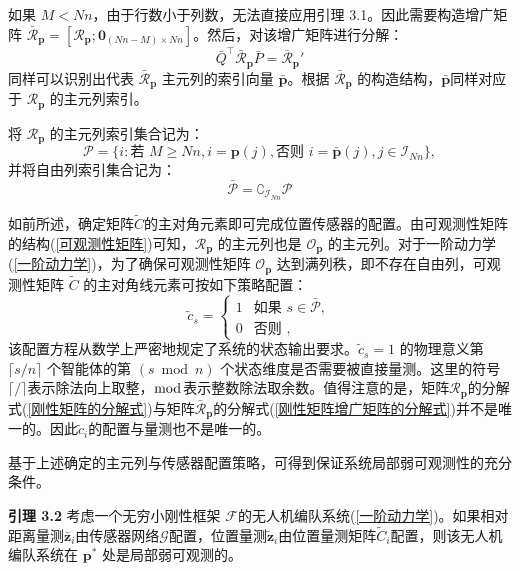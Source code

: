如果 $M < Nn$，由于行数小于列数，无法直接应用引理 3.1。因此需要构造增广矩阵 
$\bar {\mathcal{R}}_{\mathbf{p}} = 
[\mathcal{R}_{\mathbf{p}} ; \mathbf{0}_{(Nn-M) \times Nn}]$。然后，对该增广矩阵进行分解：
\begin{equation}
	\bar Q^{\top} \bar {\mathcal{R}}_{\mathbf{p}} \bar {P} 
	= \bar {\mathcal{R}}_{\mathbf{p}}'
	\label{刚性矩阵增广矩阵的分解式}
\end{equation}
同样可以识别出代表 $ \bar {\mathcal{R}}_{\mathbf{p}} $ 主元列的索引向量 $\bar{\mathbf{p}}$。根据 $\bar {\mathcal{R}}_{\mathbf{p}}$ 的构造结构，$\bar{\mathbf{p}}$同样对应于 ${\mathcal{R}}_{\mathbf{p}}$ 的主元列索引。

将 ${\mathcal{R}}_{\mathbf{p}}$ 的主元列索引集合记为：
\begin{equation}
	\mathcal{P}=\{i:\text{若 } M\ge Nn, i = \mathbf{p}(j), \text{否则 } i=\bar{\mathbf{p}}(j), j\in\mathcal{I}_{Nn}\},
\end{equation}
并将自由列索引集合记为：
\begin{equation}
	\bar{\mathcal{P}}=\complement_{\mathcal{I}_{Nn}}\mathcal{P}
\end{equation}

如前所述，确定矩阵$\tilde{C}  $的主对角元素即可完成位置传感器的配置。由可观测性矩阵的结构(\ref{可观测性矩阵})可知，${\mathcal{R}}_{\mathbf{p}}$ 的主元列也是 $ \mathcal{O}_{\mathbf{p}} $ 的主元列。对于一阶动力学(\ref{一阶动力学})，为了确保可观测性矩阵 $\mathcal{O}_{\mathbf{p}}$ 达到满列秩，即不存在自由列，可观测性矩阵 $\tilde{C}$ 的主对角线元素可按如下策略配置：
\begin{equation}
	\tilde{c}_{s} = 
	\begin{cases}
		1 & \text{如果 } s \in \bar{\mathcal{P}},\\
		0 & \text{否则 } ,
	\end{cases}
	\label{可观测性矩阵主对角元素配置策略}
\end{equation}
该配置方程从数学上严密地规定了系统的状态输出要求。$\tilde{c}_{s}=1$ 的物理意义第 $\lceil s/n \rceil$ 个智能体的第 $(s \bmod n)$ 个状态维度是否需要被直接量测。这里的符号$\lceil / \rceil$表示除法向上取整，$ \bmod $表示整数除法取余数。值得注意的是，矩阵${\mathcal{R}}_{\mathbf{p}} $的分解式(\ref{刚性矩阵的分解式})与矩阵$ \bar {\mathcal{R}}_{\mathbf{p}}  $的分解式(\ref{刚性矩阵增广矩阵的分解式})并不是唯一的。因此$ \tilde{c}_i $的配置与量测也不是唯一的。

基于上述确定的主元列与传感器配置策略，可得到保证系统局部弱可观测性的充分条件。

\textbf{引理 3.2} 考虑一个无穷小刚性框架 $\mathcal{F}$的无人机编队系统(\ref{一阶动力学})。如果相对距离量测$\bar{\mathbf{z}}_i$由传感器网络$\mathcal{G}$配置，位置量测$ \tilde{\mathbf{z}}_i$由位置量测矩阵$\tilde{C}_i $配置，则该无人机编队系统在 $\mathbf{p}^{*}$ 处是局部弱可观测的。

